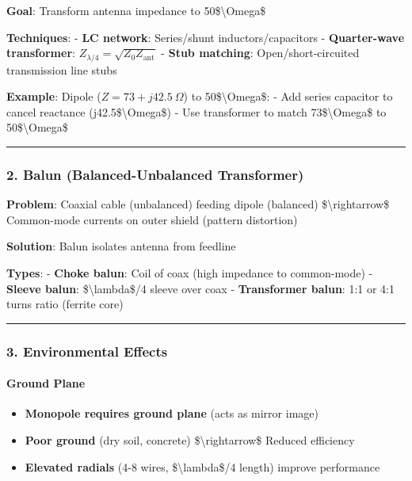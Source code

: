\textbf{Goal}: Transform antenna impedance to 50\$\textbackslash Omega\$

\textbf{Techniques}: - \textbf{LC network}: Series/shunt
inductors/capacitors - \textbf{Quarter-wave transformer}:
\(Z_{\lambda/4} = \sqrt{Z_0 Z_{\text{ant}}}\) - \textbf{Stub matching}:
Open/short-circuited transmission line stubs

\textbf{Example}: Dipole (\(Z = 73 + j42.5\ \Omega\)) to
50\$\textbackslash Omega\$: - Add series capacitor to cancel reactance
(j42.5\$\textbackslash Omega\$) - Use transformer to match
73\$\textbackslash Omega\$ to 50\$\textbackslash Omega\$

\begin{center}\rule{0.5\linewidth}{0.5pt}\end{center}

\subsubsection{2. Balun (Balanced-Unbalanced
Transformer)}\label{balun-balanced-unbalanced-transformer}

\textbf{Problem}: Coaxial cable (unbalanced) feeding dipole (balanced)
\$\textbackslash rightarrow\$ Common-mode currents on outer shield
(pattern distortion)

\textbf{Solution}: Balun isolates antenna from feedline

\textbf{Types}: - \textbf{Choke balun}: Coil of coax (high impedance to
common-mode) - \textbf{Sleeve balun}: \$\textbackslash lambda\$/4 sleeve
over coax - \textbf{Transformer balun}: 1:1 or 4:1 turns ratio (ferrite
core)

\begin{center}\rule{0.5\linewidth}{0.5pt}\end{center}

\subsubsection{3. Environmental Effects}\label{environmental-effects}

\paragraph{Ground Plane}\label{ground-plane}

\begin{itemize}
\tightlist
\item
  \textbf{Monopole requires ground plane} (acts as mirror image)
\item
  \textbf{Poor ground} (dry soil, concrete)
  \$\textbackslash rightarrow\$ Reduced efficiency
\item
  \textbf{Elevated radials} (4-8 wires, \$\textbackslash lambda\$/4
  length) improve performance
\end{itemize}

